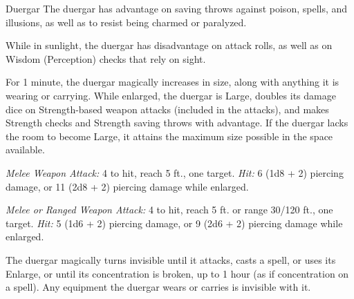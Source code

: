 \documentclass[10pt,a4paper,twoside,bg=print,twocolumn,openany,nodeprecatedcode]{dndbook}
\begin{document}
\begin{DndMonster}[float=t]{Duergar}
\DndMonsterBasics[
armor-class = {16 (\textit{scale mail})},
hit-points = {\DndDice{4d8 + 4}},
speed = {25 ft.}
]
\DndMonsterAbilityScores[
 str = 14,
 dex = 11,
 con = 14,
 int = 11,
 wis = 10,
 cha = 9
]
\DndMonsterDetails[
damage-resistances = {poison},
senses = {darkvision 120 ft., passive perception 10},
languages = {Dwarvish, Undercommon},
challenge = 1,
]
The duergar has advantage on saving throws against poison, spells, and illusions, as well as to resist being charmed or paralyzed.

While in sunlight, the duergar has disadvantage on attack rolls, as well as on Wisdom (Perception) checks that rely on sight.

For 1 minute, the duergar magically increases in size, along with anything it is wearing or carrying. While enlarged, the duergar is Large, doubles its damage dice on Strength-based weapon attacks (included in the attacks), and makes Strength checks and Strength saving throws with advantage. If the duergar lacks the room to become Large, it attains the maximum size possible in the space available.

\textsl{Melee Weapon Attack:} 4 to hit, reach 5 ft., one target. \textsl{Hit:} 6 (1d8 + 2) piercing damage, or 11 (2d8 + 2) piercing damage while enlarged.

\textsl{Melee or Ranged Weapon Attack:} 4 to hit, reach 5 ft. or range 30/120 ft., one target. \textsl{Hit:} 5 (1d6 + 2) piercing damage, or 9 (2d6 + 2) piercing damage while enlarged.

The duergar magically turns invisible until it attacks, casts a spell, or uses its Enlarge, or until its concentration is broken, up to 1 hour (as if concentration on a spell). Any equipment the duergar wears or carries is invisible with it.

\end{DndMonster}
\end{document}
